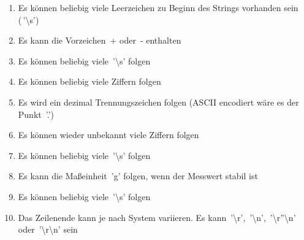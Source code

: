 {\begin{enumerate}
\singlespacing
\item Es können beliebig viele Leerzeichen zu Beginn des Strings vorhanden sein (\,{\Menlo '\textbackslash s'})
\item Es kann die Vorzeichen \,{\Menlo +} oder \,{\Menlo -} enthalten
\item Es können beliebig viele \,{\Menlo '\textbackslash s'} folgen
\item Es können beliebig viele Ziffern folgen
\item Es wird ein dezimal Trennungszeichen folgen (ASCII encodiert wäre es der Punkt \,{\Menlo '.'})
\item Es können wieder unbekannt viele Ziffern folgen
\item Es können beliebig viele \,{\Menlo '\textbackslash s'} folgen
\item Es kann die Maßeinheit \,{\Menlo 'g'} folgen, wenn der Messwert stabil ist
\item Es können beliebig viele \,{\Menlo '\textbackslash s'} folgen
\item Das Zeilenende kann je nach System variieren. Es kann \,{\Menlo '\textbackslash r'}, \,{\Menlo '\textbackslash n'}, \,{\Menlo '\textbackslash r''\textbackslash n'} oder \,{\Menlo '\textbackslash r\textbackslash n'} sein
\end{enumerate}


}
